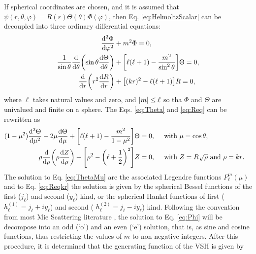 If spherical coordinates are chosen, and it is assumed that $\psi(r,\theta,\varphi) = R(r)\Theta(\theta)\Phi(\varphi)$, then Eq. \eqref{eq:HelmoltzScalar} can be decoupled into three ordinary differential equations:
%
 \begin{align}
	\dv[2]{\Phi}{\varphi} &+ m^2 \Phi =0,
 		\label{eq:Phi}\\
	\frac{1}{\sin\theta}\dv{\theta}\qty(\sin\theta\dv{\Theta}{\theta}) &+ \qty[\ell(\ell+1)- \frac{m^2}{\sin^2\theta}]\Theta =0,
		\label{eq:Theta}\\
	\dv{r}\qty(r^2\dv{R}{r}) &+ \qty[ (k r)^2 - \ell (\ell +1)] R =0,
 		\label{eq:Req}
\end{align}
%
where $\ell$ takes natural values and zero, and $\abs{m}\leq \ell$ so tha $\Phi$ and $\Theta$ are univalued and finite on a sphere. The Eqs. \eqref{eq:Theta} and \eqref{eq:Req} can be rewritten as
%
 \begin{align}
(1-\mu^2)\dv[2]{\Theta}{\mu} - 2\mu\dv{\Theta}{\mu} + \qty[\ell(\ell+1)-\frac{m^2}{1-\mu^2}]\Theta &= 0, \qqtext{ with $\mu = \cos\theta$,}
	\label{eq:ThetaMu}\\
	\rho\dv{\rho}\qty(\rho\dv{Z}{\rho}) +  \qty[\rho^2 - \qty(\ell + \frac12)^2]Z  &= 0,  \qqtext{ with $Z = R\sqrt{\rho}$ and $\rho = kr$.}
\label{eq:Reqkr}
\end{align}
%
The solution to Eq. \eqref{eq:ThetaMu} are the associated Legendre functions $ P_\ell^m(\mu)$ and to Eq. \eqref{eq:Reqkr} the solution is given by the spherical Bessel functions of the first ($j_\ell$)  and second ($y_\ell$) kind, or the spherical Hankel functions of first ($h_\ell^{(1)} = j_\ell + iy_\ell$) and second ( $h_\ell^{(2)} = j_\ell - iy_\ell$)  kind. Following the convention from most Mie Scattering literature \cite{zangwill_modern_2013}, the solution to Eq. \eqref{eq:Phi} will be decompose into an odd (`o') and an even (`e') solution, that is, as sine and cosine functions, thus restricting the values of $m$ to non negative integers. After this procedure, it is determined that the generating function of the VSH is given by
%
%
%
%
